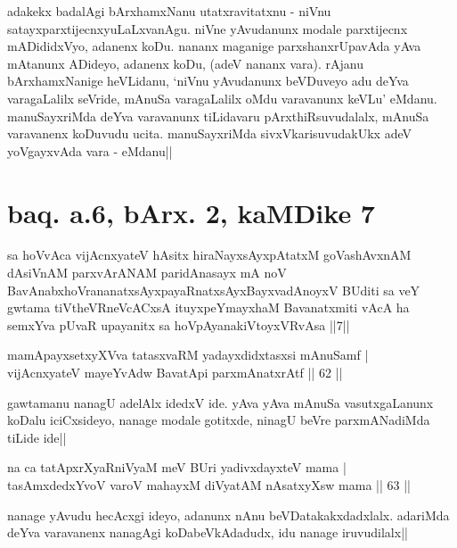 \begin{artha}
adakekx badalAgi bArxhamxNanu utatxravitatxnu - niVnu 
satayxparxtijecnxyuLaLxvanAgu. niVne yAvudanunx modale parxtijecnx 
mADididxVyo, adanenx koDu. nananx maganige parxshanxrUpavAda yAva 
mAtanunx ADideyo, adanenx koDu, (adeV nananx vara). rAjanu 
bArxhamxNanige heVLidanu, `niVnu yAvudanunx beVDuveyo adu deYva 
varagaLalilx seVride, mAnuSa varagaLalilx oMdu varavanunx keVLu' 
eMdanu. manuSayxriMda deYva varavanunx tiLidavaru pArxthiRsuvudalalx, 
mAnuSa varavanenx koDuvudu ucita. manuSayxriMda sivxVkarisuvudakUkx 
adeV yoVgayxvAda vara - eMdanu|| 
\end{artha}

\section*{baq. a.6, bArx. 2, kaMDike 7}

\begin{shl}
sa hoVvAca vijAcnxyateV hAsitx hiraNayxsAyxpAtatxM goVashAvxnAM dAsiVnAM parxvArANAM paridAnasayx mA noV BavAnabxhoVrananatxsAyxpayaRnatxsAyxBayxvadAnoyxV BUditi sa veY gwtama tiVtheVRneVcACxsA ituyxpeYmayxhaM Bavanatxmiti vAcA ha semxYva pUvaR upayanitx sa hoVpAyanakiVtoyxVRvAsa ||7||
\end{shl}

\begin{shl}
mamApayxsetxyXVva tatasxvaRM yadayxdidxtasxsi mAnuSamf | \\
vijAcnxyateV mayeYvA\s \s dw BavatA\s pi parxmAnatxrAtf \hfill|| 62 || 
\end{shl}

\begin{artha}
gawtamanu nanagU adelAlx idedxV ide. yAva yAva mAnuSa vasutxgaLanunx 
koDalu iciCxsideyo, nanage modale gotitxde, ninagU beVre parxmANadiMda 
tiLide ide||
\end{artha}

\begin{shl}
na ca tatApxrXyaRniVyaM meV BUri yadivxdayxteV mama | \\
tasAmxdedxYvoV varoV mahayxM diVyatAM nAsatxyXsw mama \hfill|| 63 || 
\end{shl}

\begin{artha}
nanage yAvudu hecAcxgi ideyo, adanunx nAnu beVDatakakxdadxlalx. 
adariMda deYva varavanenx nanagAgi koDabeVkAdadudx, idu nanage 
iruvudilalx||
\end{artha}


